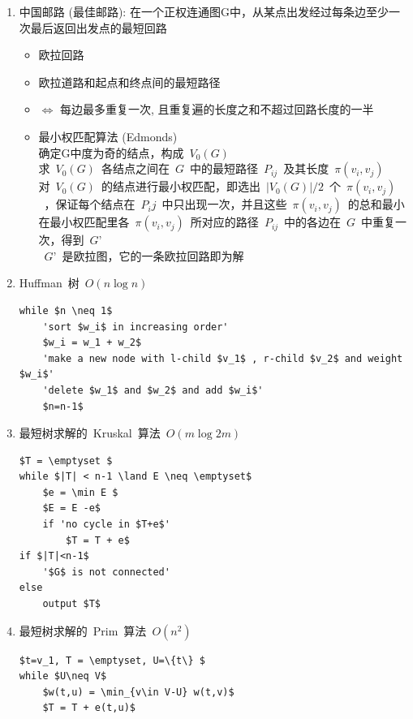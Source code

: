 \documentclass[11pt,a4paper]{article}%
\renewcommand{\[}{~$}
\renewcommand{\]}{$~}%
\begin{document}
\begin{enumerate}
\begin{lstlisting}[mathescape,frame=shadowbox, caption=最短路径的 Dijkstra 算法]
	'find' $\min_{i\in\bar S} \pi(i) = \pi(j)$
	$\bar S = \bar S -j$
	for $i\in \bar S \cap \Gamma^+(j)$
		$\pi(i) = \min (\pi(i), \pi(j) + w_{ji})$
	 	\end{lstlisting}
	 \item 中国邮路 (最佳邮路): 在一个正权连通图G中，从某点出发经过每条边至少一次最后返回出发点的最短回路
	   \begin{itemize}
	    \item 欧拉回路
	    \item 欧拉道路和起点和终点间的最短路径
	    \item $\Leftrightarrow$ 每边最多重复一次, 且重复遍的长度之和不超过回路长度的一半
	    \item 最小权匹配算法 (Edmonds)\\
	    	确定G中度为奇的结点，构成\[V_0(G)\]\\
	    	求\[V_0(G)\]各结点之间在\[G\]中的最短路径\[P_{ij}\]及其长度\[\pi(v_i,v_j)\]\\
	    	对\[V_0(G)\]的结点进行最小权匹配，即选出\[| V_0(G) |/2\]个\[\pi(v_i,v_j)\]，保证每个结点在\[P_ij\]中只出现一次，并且这些\[\pi(v_i,v_j)\]的总和最小\\
	    	在最小权匹配里各\[\pi(v_i,v_j)\]所对应的路径\[P_{ij}\]中的各边在\[G\]中重复一次，得到\[G’\]\\
	    	\[G’\]是欧拉图，它的一条欧拉回路即为解
	   \end{itemize}
	  \item Huffman~树\[O(n\log n)\]
	  	\begin{lstlisting}[mathescape,frame=shadowbox, caption=Huffman~树]
while $n \neq 1$
	'sort $w_i$ in increasing order'
	$w_i = w_1 + w_2$
	'make a new node with l-child $v_1$ , r-child $v_2$ and weight $w_i$'
	'delete $w_1$ and $w_2$ and add $w_i$'
	$n=n-1$
	 	\end{lstlisting}
	 \item 最短树求解的~Kruskal~算法\[O(m\log 2m)\]
	  	\begin{lstlisting}[mathescape,frame=shadowbox, caption=Kruskal~算法]
$T = \emptyset $
while $|T| < n-1 \land E \neq \emptyset$
	$e = \min E $
	$E = E -e$
	if 'no cycle in $T+e$'
		$T = T + e$
if $|T|<n-1$
	'$G$ is not connected'
else
	output $T$
	 	\end{lstlisting}
	 \item 最短树求解的~Prim~算法\[O(n^2)\]
	  	\begin{lstlisting}[mathescape,frame=shadowbox, caption=Prim~算法]
$t=v_1, T = \emptyset, U=\{t\} $
while $U\neq V$
	$w(t,u) = \min_{v\in V-U} w(t,v)$
	$T = T + e(t,u)$

\end{lstlisting}
\end{enumerate}
\end{document}
